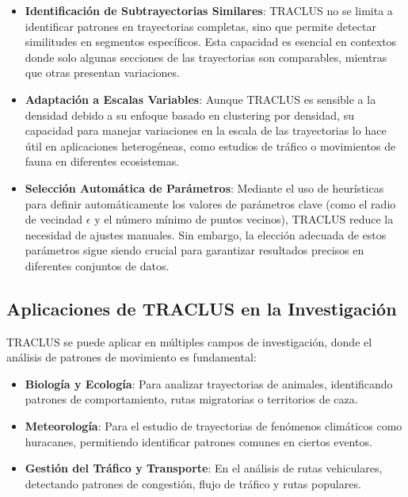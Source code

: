 \begin{itemize}
    \item \textbf{Identificación de Subtrayectorias Similares}: TRACLUS no se limita a identificar patrones en trayectorias completas, sino que permite detectar similitudes en segmentos específicos. Esta capacidad es esencial en contextos donde solo algunas secciones de las trayectorias son comparables, mientras que otras presentan variaciones.
    
    \item \textbf{Adaptación a Escalas Variables}: Aunque TRACLUS es sensible a la densidad debido a su enfoque basado en clustering por densidad, su capacidad para manejar variaciones en la escala de las trayectorias lo hace útil en aplicaciones heterogéneas, como estudios de tráfico o movimientos de fauna en diferentes ecosistemas.
    
    \item \textbf{Selección Automática de Parámetros}: Mediante el uso de heurísticas para definir automáticamente los valores de parámetros clave (como el radio de vecindad $\epsilon$ y el número mínimo de puntos vecinos), TRACLUS reduce la necesidad de ajustes manuales. Sin embargo, la elección adecuada de estos parámetros sigue siendo crucial para garantizar resultados precisos en diferentes conjuntos de datos.
\end{itemize}


\subsection*{Aplicaciones de TRACLUS en la Investigación}
TRACLUS se puede aplicar en múltiples campos de investigación, donde el análisis de patrones de movimiento es fundamental:

\begin{itemize}
    \item \textbf{Biología y Ecología}: Para analizar trayectorias de animales, identificando patrones de comportamiento, rutas migratorias o territorios de caza.
    
    \item \textbf{Meteorología}: Para el estudio de trayectorias de fenómenos climáticos como huracanes, permitiendo identificar patrones comunes en ciertos eventos.
    
    \item \textbf{Gestión del Tráfico y Transporte}: En el análisis de rutas vehiculares, detectando patrones de congestión, flujo de tráfico y rutas populares.
\end{itemize}


